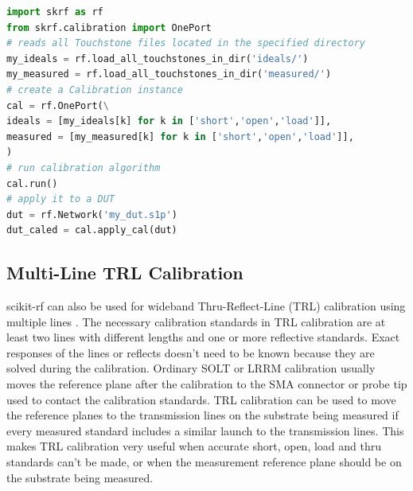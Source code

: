 \documentclass{IEEEjmw}
\begin{document}
\begin{lstlisting}[language=Python]
import skrf as rf
from skrf.calibration import OnePort
# reads all Touchstone files located in the specified directory
my_ideals = rf.load_all_touchstones_in_dir('ideals/')
my_measured = rf.load_all_touchstones_in_dir('measured/')
# create a Calibration instance
cal = rf.OnePort(\
ideals = [my_ideals[k] for k in ['short','open','load']],
measured = [my_measured[k] for k in ['short','open','load']],
)
# run calibration algorithm
cal.run()
# apply it to a DUT
dut = rf.Network('my_dut.s1p')
dut_caled = cal.apply_cal(dut)
\end{lstlisting}


\subsection{Multi-Line TRL Calibration}
scikit-rf can also be used for wideband Thru-Reflect-Line (TRL) calibration using multiple lines \cite{marks1991}. The necessary calibration standards in TRL calibration are at least two lines with different lengths and one or more reflective standards. Exact responses of the lines or reflects doesn’t need to be known because they are solved during the calibration. Ordinary SOLT or LRRM \cite{davidson1990} calibration usually moves the reference plane after the calibration to the SMA connector or probe tip used to contact the calibration standards. TRL calibration can be used to move the reference planes to the transmission lines on the substrate being measured if every measured standard includes a similar launch to the transmission lines. This makes TRL calibration very useful when accurate short, open, load and thru standards can’t be made, or when the measurement reference plane should be on the substrate being measured. 
\end{document}
